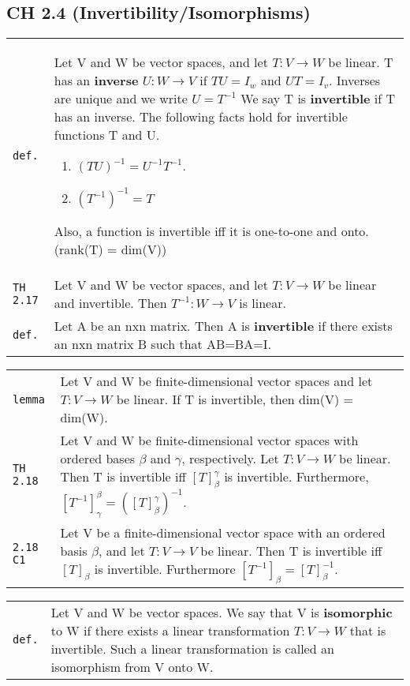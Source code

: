 \documentclass[10pt,landscape]{article}
\begin{document}
\begin{multicols}{3}
\section{CH 2.4 (Invertibility/Isomorphisms)}
\begin{tabular}{@{}p{\the\MyLen}%
                @{}p{\linewidth-\the\MyLen}@{}} %
\verb!def.! & Let V and W be vector spaces, and let $T:V\rightarrow W$ be linear. T has an \textbf{inverse} $U:W\rightarrow V$ if $TU=I_w$ and $UT=I_v$. Inverses are unique and we write $U=T^{-1}$ We say T is \textbf{invertible} if T has an inverse.
		   The following facts hold for invertible functions T and U.
		   \begin{enumerate}
		   \item $(TU)^{-1} = U^{-1}T^{-1}$.
		   \item $(T^{-1})^{-1} = T$
		   \end{enumerate}
		   Also, a function is invertible iff it is one-to-one and onto. (rank(T) = dim(V))\\
\verb!TH 2.17! & Let V and W be vector spaces, and let $T:V\rightarrow W$ be linear and invertible. Then $T^{-1}:W\rightarrow V$ is linear.\\
\verb!def.! & Let A be an nxn matrix. Then A is \textbf{invertible} if there exists an nxn matrix B such that AB=BA=I.\\
\end{tabular}
\begin{tabular}{@{}p{\the\MyLen}%
                @{}p{\linewidth-\the\MyLen}@{}} %
\verb!lemma! & Let V and W be finite-dimensional vector spaces and let $T:V\rightarrow W$ be linear. If T is invertible, then dim(V) = dim(W).\\
\verb!TH 2.18! & Let V and W be finite-dimensional vector spaces with ordered bases $\beta$ and $\gamma$, respectively. Let $T:V\rightarrow W$ be linear. Then T is invertible iff $[T]_\beta^\gamma$ is invertible. Furthermore, $[T^{-1}]_\gamma^\beta = ([T]_\beta^\gamma)^{-1}$.\\
\verb!2.18 C1! & Let V be a finite-dimensional vector space with an ordered basis $\beta$, and let $T:V\rightarrow V$ be linear. Then T is invertible iff $[T]_\beta$ is invertible. Furthermore $[T^{-1}]_\beta = [T]_\beta^{-1}$.\\
\end{tabular}
\begin{tabular}{@{}p{\the\MyLen}%
                @{}p{\linewidth-\the\MyLen}@{}} %
\verb!def.! & Let V and W be vector spaces. We say that V is \textbf{isomorphic} to W if there exists a linear transformation $T:V\rightarrow W$ that is invertible. Such a linear transformation is called an isomorphism from V onto W.\\

\end{tabular}
\end{multicols}
\end{document}
